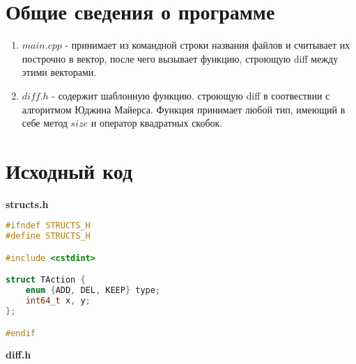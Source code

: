 \section{Общие сведения о программе}
\begin{enumerate}
    \item $main.cpp$ - принимает из командной строки названия файлов и считывает их построчно в вектор, после чего вызывает функцию, строющую diff между этими векторами.
    \item $diff.h$ - содержит шаблонную функцию. строющую diff в соотвествии с алгоритмом Юджина Майерса. Функция принимает любой тип, имеющий в себе метод $size$ и оператор квадратных скобок.
\end{enumerate}

\pagebreak

\section{Исходный код}

\textbf{structs.h}

\begin{lstlisting}[language=C++]
#ifndef STRUCTS_H
#define STRUCTS_H

#include <cstdint>

struct TAction {
    enum {ADD, DEL, KEEP} type;
    int64_t x, y;
};

#endif
\end{lstlisting}

\textbf{diff.h}


